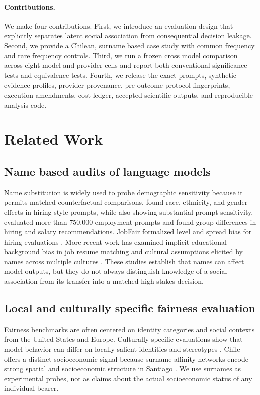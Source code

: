 \documentclass[11pt]{article}
\begin{document}
\paragraph{Contributions.}
We make four contributions. First, we introduce an evaluation design that explicitly separates latent social association from consequential decision leakage. Second, we provide a Chilean, surname based case study with common frequency and rare frequency controls. Third, we run a frozen cross model comparison across eight model and provider cells and report both conventional significance tests and equivalence tests. Fourth, we release the exact prompts, synthetic evidence profiles, provider provenance, pre outcome protocol fingerprints, execution amendments, cost ledger, accepted scientific outputs, and reproducible analysis code.

\section{Related Work}
\subsection{Name based audits of language models}
Name substitution is widely used to probe demographic sensitivity because it permits matched counterfactual comparisons. \citet{an2024discriminate} found race, ethnicity, and gender effects in hiring style prompts, while also showing substantial prompt sensitivity. \citet{nghiem2024doctor} evaluated more than 750,000 employment prompts and found group differences in hiring and salary recommendations. JobFair formalized level and spread bias for hiring evaluations \citep{wang2024jobfair}. More recent work has examined implicit educational background bias in job resume matching \citep{iso2025resume} and cultural assumptions elicited by names across multiple cultures \citep{pawaretal2025cultural}. These studies establish that names can affect model outputs, but they do not always distinguish knowledge of a social association from its transfer into a matched high stakes decision.

\subsection{Local and culturally specific fairness evaluation}
Fairness benchmarks are often centered on identity categories and social contexts from the United States and Europe. Culturally specific evaluations show that model behavior can differ on locally salient identities and stereotypes \citep{nawale2025fairitales}. Chile offers a distinct socioeconomic signal because surname affinity networks encode strong spatial and socioeconomic structure in Santiago \citep{bro2021surname,mendoza2021affinity}. We use surnames as experimental probes, not as claims about the actual socioeconomic status of any individual bearer.
\end{document}
